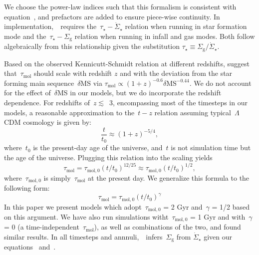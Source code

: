 We choose the power-law indices such that this formalism is consistent 
with equation~, and prefactors are added to ensure 
piece-wise continuity. 
In implementation,~\vice~requires the~$\tau_\star-\dot{\Sigma}_\star$ relation 
when running in star formation mode and the~$\tau_\star-\Sigma_\text{g}$ 
relation when running in infall and gas modes. 
Both follow algebraically from this relationship given the substitution 
$\tau_\star \equiv \Sigma_\text{g} / \dot{\Sigma}_\star$. 
\par 
Based on the observed Kennicutt-Schmidt relation at different redshifts, 
\citet{Tacconi2018} suggest that~$\tau_\text{mol}$ should scale with redshift 
$z$ and with the deviation from the star forming main sequence~$\delta$MS via 
$\tau_\text{mol} \propto (1 + z)^{-0.6}\delta\text{MS}^{-0.44}$. 
We do not account for the effect of~$\delta$MS in our models, but we do 
incorporate the redshift dependence. 
For redshifts of~$z \lesssim$~3, encompassing most of the timesteps in 
our models, a reasonable approximation to the~$t - z$ relation assuming 
typical~$\Lambda$CDM cosmology is given by: 
\begin{equation} 
\frac{t}{t_0} \approx (1 + z)^{-5/4}, 
\end{equation} 
where~$t_0$ is the present-day age of the universe, and~$t$ is not simulation 
time but the age of the universe. Plugging this relation into the 
\citet{Tacconi2018} scaling yields 
\begin{equation} 
\tau_\text{mol} = \tau_{\text{mol},0}(t/t_0)^{12/25} \approx 
\tau_{\text{mol},0}(t/t_0)^{1/2}, 
\end{equation} 
where~$\tau_{\text{mol},0}$ is simply~$\tau_\text{mol}$ at the present day. We 
generalize this formula to the following form: 
\begin{equation} 
\tau_\text{mol} = \tau_{\text{mol},0}(t/t_0)^\gamma 
\label{migration:eq:tau_mol}
\end{equation} 
In this paper we present models which adopt~$\tau_{\text{mol},0}$ = 2 Gyr 
\citep{Leroy2008, Leroy2013, Tacconi2018} and~$\gamma$ = 1/2 based on this 
argument. 
We have also run simulations witht~$\tau_{\text{mol},0}$ = 1 
Gyr and with~$\gamma$ = 0 (a time-independent~$\tau_\text{mol}$), as well as 
combinations of the two, and found similar results. 
In all timesteps and annnuli,~\vice~infers~$\Sigma_\text{g}$ from 
$\dot{\Sigma}_\star$ given our equations~ and~. 
\par
